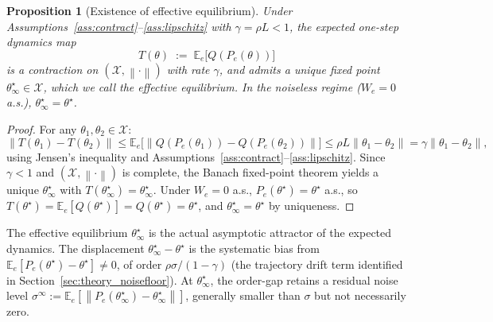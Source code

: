 \documentclass[12pt,a4paper]{article}
\newtheorem{proposition}[definition]{Proposition}
\newcommand{\X}{\mathcal{X}}
\newcommand{\norm}[1]{\left\lVert#1\right\rVert}
\begin{document}
\begin{proposition}[Existence of effective equilibrium]
\label{prop:effective_eq}
Under Assumptions~\ref{ass:contract}--\ref{ass:lipschitz} with
$\gamma = \rho L < 1$, the expected one-step dynamics map
\[
  T(\theta) \;:=\; \mathbb{E}_e\bigl[Q(P_e(\theta))\bigr]
\]
is a contraction on $(\X, \norm{\cdot})$ with rate $\gamma$, and admits a
unique fixed point $\theta^\star_\infty \in \X$, which we call the
\emph{effective equilibrium}. In the noiseless regime ($W_e = 0$ a.s.),
$\theta^\star_\infty = \theta^\star$.
\end{proposition}

\begin{proof}
For any $\theta_1, \theta_2 \in \X$:
\[
  \norm{T(\theta_1) - T(\theta_2)}
  \leq \mathbb{E}_e\bigl[\norm{Q(P_e(\theta_1)) - Q(P_e(\theta_2))}\bigr]
  \leq \rho L \norm{\theta_1 - \theta_2}
  = \gamma \norm{\theta_1 - \theta_2},
\]
using Jensen's inequality and Assumptions~\ref{ass:contract}--\ref{ass:lipschitz}.
Since $\gamma < 1$ and $(\X, \norm{\cdot})$ is complete, the Banach
fixed-point theorem yields a unique $\theta^\star_\infty$ with
$T(\theta^\star_\infty) = \theta^\star_\infty$. Under $W_e = 0$ a.s.,
$P_e(\theta^\star) = \theta^\star$ a.s., so
$T(\theta^\star) = \mathbb{E}_e[Q(\theta^\star)] = Q(\theta^\star) = \theta^\star$,
and $\theta^\star_\infty = \theta^\star$ by uniqueness. \qedhere
\end{proof}

The effective equilibrium $\theta^\star_\infty$ is the actual asymptotic
attractor of the expected dynamics. The displacement
$\theta^\star_\infty - \theta^\star$ is the systematic bias from
$\mathbb{E}_e[P_e(\theta^\star) - \theta^\star] \neq 0$, of order
$\rho\sigma/(1-\gamma)$ (the trajectory drift term identified in
Section~\ref{sec:theory_noisefloor}). At $\theta^\star_\infty$, the
order-gap retains a residual noise level
$\sigma^\infty := \mathbb{E}_e[\norm{P_e(\theta^\star_\infty) -
\theta^\star_\infty}]$, generally smaller than $\sigma$ but not necessarily
zero.
\end{document}
